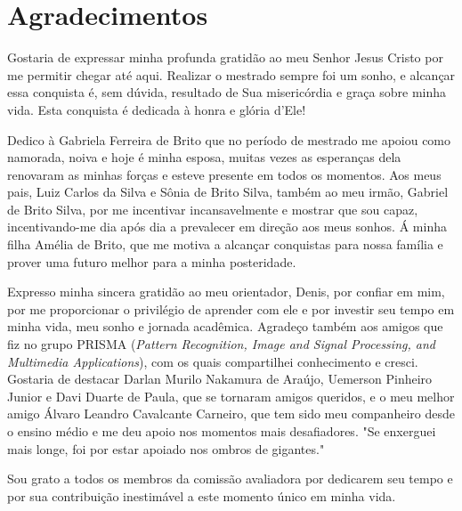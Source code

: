 \newpage
\thispagestyle{empty}
\section*{Agradecimentos}
Gostaria de expressar minha profunda gratidão ao meu Senhor Jesus Cristo por me permitir chegar até aqui. Realizar o mestrado sempre foi um sonho, e alcançar essa conquista é, sem dúvida, resultado de Sua misericórdia e graça sobre minha vida. Esta conquista é dedicada à honra e glória d'Ele!

Dedico à Gabriela Ferreira de Brito que no período de mestrado me apoiou como namorada, noiva e hoje é minha esposa, muitas vezes as esperanças dela renovaram as minhas forças e esteve presente em todos os momentos. Aos meus pais, Luiz Carlos da Silva e Sônia de Brito Silva, também ao meu irmão, Gabriel de Brito Silva, por me incentivar incansavelmente e mostrar que sou capaz, incentivando-me dia após dia a prevalecer em direção aos meus sonhos. Á minha filha Amélia de Brito, que me motiva a alcançar conquistas para nossa família e prover uma futuro melhor para a minha posteridade.

Expresso minha sincera gratidão ao meu orientador, Denis, por confiar em mim, por me proporcionar o privilégio de aprender com ele e por investir seu tempo em minha vida, meu sonho e jornada acadêmica. Agradeço também aos amigos que fiz no grupo PRISMA (\textit{Pattern Recognition, Image and Signal Processing, and Multimedia Applications}), com os quais compartilhei conhecimento e cresci. Gostaria de destacar Darlan Murilo Nakamura de Araújo, Uemerson Pinheiro Junior e Davi Duarte de Paula, que se tornaram amigos queridos, e o meu melhor amigo Álvaro Leandro Cavalcante Carneiro, que tem sido meu companheiro desde o ensino médio e me deu apoio nos momentos mais desafiadores. "Se enxerguei mais longe, foi por estar apoiado nos ombros de gigantes."

Sou grato a todos os membros da comissão avaliadora por dedicarem seu tempo e por sua contribuição inestimável a este momento único em minha vida.